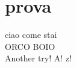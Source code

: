 \documentclass{article}
\begin{document}
    \section{prova}
        ciao come stai\\
        ORCO BOIO\\
        Another try! A! z!
\end{document}
